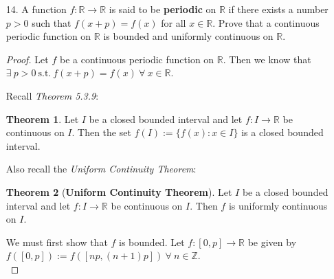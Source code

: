 \documentclass[12pt,letterpaper]{article}
\newcommand{\st}{\ \text{s.t.}\ }
\newcommand{\R}{\mathbb{R}}
\newcommand{\Z}{\mathbb{Z}}
\theoremstyle{case}
\theoremstyle{definition}
\newtheorem*{theorem*}{Theorem}
\begin{document}
\begin{enumerate}
\begin{enumerate}
\begin{proof}
				$\therefore\ \forall\ x \in A,$
				\[f(x) \in [m-\varepsilon, M+\varepsilon]\]
				$\therefore\ f$ is bounded on $A$.\\
			\end{proof}
		
			\textbf{Alternative Proof:}
			\begin{proof}
				By way of contradiction, assume that $f(A)$ is unbounded. Then we know that there exists a sequence $x_n \in A \st |f(x_n)| \geq n\ \forall\ n$.\\
				
				Since $(x_n)$ is bounded, we know that there exists a convergent subsequence $x_{n_k} \in A \st x_{n_k} \to x$. Now, since $f$ is uniformly continuous, we know that $f(x_{n_k}) \to f(x)$, which contradicts the fact that $f(A)$ is unbounded. Thus we have that if $f$ is uniformly continuous on $A$, then $f(A)$ is bounded as well.
			\end{proof}
			\item[14.] A function $f:\R \to \R$ is said to be \textbf{periodic} on $\R$ if there exists a number $p > 0$ such that $f(x+p)=f(x)$ for all $x \in \R$. Prove that a continuous periodic function on $\R$ is bounded and uniformly continuous on $\R$.\\
			
			\begin{proof}
				Let $f$ be a continuous periodic function on $\R$. Then we know that $\exists\ p>0 \st f(x+p)=f(x)\ \forall\ x \in \R$.
				
				Recall \textit{Theorem 5.3.9}:
				\begin{theorem*}
					Let $I$ be a closed bounded interval and let $f:I \rightarrow \R$ be continuous on $I$. Then the set $f(I):= \{f(x): x \in I\}$ is a closed bounded interval.
				\end{theorem*}
				Also recall the \textit{Uniform Continuity Theorem}:
				\begin{theorem*}[\textbf{Uniform Continuity Theorem}]
					Let $I$ be a closed bounded interval and let $f:I \rightarrow \R$ be continuous on $I$. Then $f$ is uniformly continuous on $I$.
				\end{theorem*}
				
				We must first show that $f$ is bounded. Let $f:[0,p] \to \R$ be given by $f([0,p]):= f([np,(n+1)p])\ \forall\ n \in \Z$.\\
				

\end{proof}
\end{enumerate}
\end{enumerate}
\end{document}
